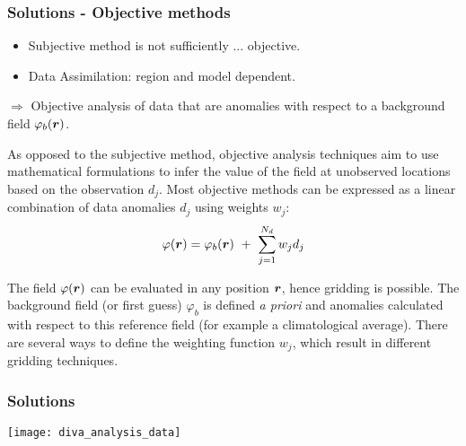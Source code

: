 
\begin{frame}
\frametitle{Solutions - Objective methods}

\begin{itemize}
\item Subjective method is not sufficiently ... objective.
\item Data Assimilation: region and model dependent.
\end{itemize}
$\Rightarrow$ Objective analysis of data that are anomalies with
respect to a background field $\varphi_b(\mbox{\boldmath $ r $})$.

As opposed to the subjective method, objective analysis techniques aim
to use mathematical formulations to infer the value of the field at
unobserved locations based on the observation $d_j$.  Most objective
methods can be expressed as a linear combination of data anomalies
$d_j$ using weights $w_j$:
\vspace{-0.5cm}
\begin{equation}
\varphi(\mbox{\boldmath $ r $}) = \varphi_b(\mbox{\boldmath $ r $}) ~+~ \sum_{j=1}^{N_d} w_j d_j
\end{equation}

The field $\varphi(\mbox{\boldmath $ r $})$ can be evaluated in any position
$\mbox{\boldmath $ r $}$, hence gridding is possible.  The {\color{red}background field (or
first guess)} $\varphi_b$ is defined {\it a priori} and anomalies
calculated with respect to this reference field (for example a
climatological average).  There are several ways to define the
weighting function $w_j$, which result in different gridding
techniques. %

\end{frame}


\begin{frame}
\frametitle{Solutions}
\centerline{
\texttt{[image: diva\_analysis\_data]}
}
\end{frame}


